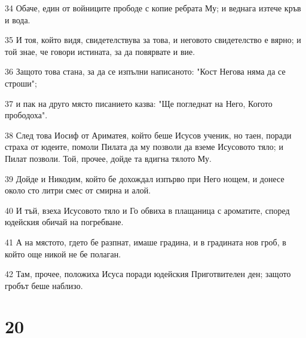 \par 34 Обаче, един от войниците прободе с копие ребрата Му; и веднага изтече кръв и вода.
\par 35 И тоя, който видя, свидетелствува за това, и неговото свидетелство е вярно; и той знае, че говори истината, за да повярвате и вие.
\par 36 Защото това стана, за да се изпълни написаното: "Кост Негова няма да се строши";
\par 37 и пак на друго място писанието казва: "Ще погледнат на Него, Когото прободоха".
\par 38 След това Иосиф от Ариматея, който беше Исусов ученик, но таен, поради страха от юдеите, помоли Пилата да му позволи да вземе Исусовото тяло; и Пилат позволи. Той, прочее, дойде та вдигна тялото Му.
\par 39 Дойде и Никодим, който бе дохождал изпърво при Него нощем, и донесе около сто литри смес от смирна и алой.
\par 40 И тъй, взеха Исусовото тяло и Го обвиха в плащаница с ароматите, според юдейския обичай на погребване.
\par 41 А на мястото, гдето бе разпнат, имаше градина, и в градината нов гроб, в който още никой не бе полаган.
\par 42 Там, прочее, положиха Исуса поради юдейския Приготвителен ден; защото гробът беше наблизо.

\chapter{20}

